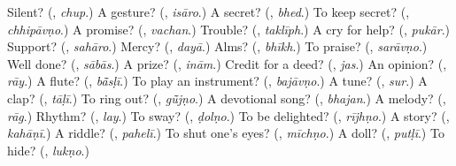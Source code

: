 \begin{tcolorbox}[breakable,colback=teal!4,colframe=teal!35!black,title={Before you move on}]
Silent? (\textbf{}, \emph{chup}.) A gesture? (\textbf{}, \emph{isāro}.) A secret? (\textbf{}, \emph{bhed}.) To keep secret? (\textbf{}, \emph{chhipāvṇo}.) A promise? (\textbf{}, \emph{vachan}.) Trouble? (\textbf{}, \emph{taklīph}.) A cry for help? (\textbf{}, \emph{pukār}.) Support? (\textbf{}, \emph{sahāro}.) Mercy? (\textbf{}, \emph{dayā}.) Alms? (\textbf{}, \emph{bhīkh}.) To praise? (\textbf{}, \emph{sarāvṇo}.) Well done? (\textbf{}, \emph{sābās}.) A prize? (\textbf{}, \emph{inām}.) Credit for a deed? (\textbf{}, \emph{jas}.) An opinion? (\textbf{}, \emph{rāy}.) A flute? (\textbf{}, \emph{bā̃sḷī}.) To play an instrument? (\textbf{}, \emph{bajāvṇo}.) A tune? (\textbf{}, \emph{sur}.) A clap? (\textbf{}, \emph{tāḷī}.) To ring out? (\textbf{}, \emph{gū̃jṇo}.) A devotional song? (\textbf{}, \emph{bhajan}.) A melody? (\textbf{}, \emph{rāg}.) Rhythm? (\textbf{}, \emph{lay}.) To sway? (\textbf{}, \emph{ḍolṇo}.) To be delighted? (\textbf{}, \emph{rījhṇo}.) A story? (\textbf{}, \emph{kahāṇī}.) A riddle? (\textbf{}, \emph{pahelī}.) To shut one's eyes? (\textbf{}, \emph{mīchṇo}.) A doll? (\textbf{}, \emph{putḷī}.) To hide? (\textbf{}, \emph{lukṇo}.)
\end{tcolorbox}
